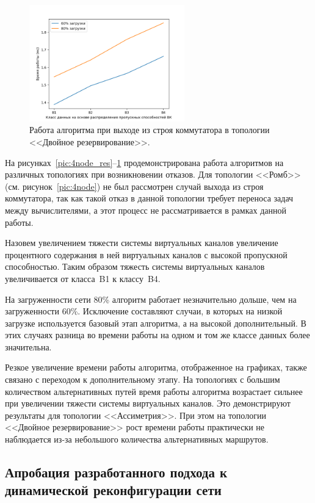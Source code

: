 \documentclass[12pt, a4paper]{article}
\begin{document}
\begin{figure}[h!]
	\centering
	\includegraphics[width=0.60\textwidth]{img/double_res_sw.png}
	\caption{Работа алгоритма при выходе из строя коммутатора в топологии <<Двойное резервирование>>.}
	\label{pic:double_res_sw}
\end{figure}


На рисунках~\ref{pic:4node_res}--\ref{pic:double_res_sw} продемонстрирована работа алгоритмов на различных топологиях при возникновении отказов. Для топологии <<Ромб>> (см. рисунок~\ref{pic:4node}) не был рассмотрен случай выхода из строя коммутатора, так как такой отказ в данной топологии требует переноса задач между вычислителями, а этот процесс не рассматривается в рамках данной работы.

Назовем увеличением тяжести системы виртуальных каналов увеличение процентного содержания в ней виртуальных каналов с высокой пропускной способностью. Таким образом тяжесть системы виртуальных каналов увеличивается от класса~B1 к классу~B4. 

На загруженности сети 80\% алгоритм работает незначительно дольше, чем на загруженности 60\%. Исключение составляют случаи, в которых на низкой загрузке используется базовый этап алгоритма, а на высокой дополнительный. В этих случаях разница во времени работы на одном и том же классе данных более значительна.

Резкое увеличение времени работы алгоритма, отображенное на графиках, также связано с переходом к дополнительному этапу. На топологиях с большим количеством альтернативных путей время работы алгоритма возрастает сильнее при увеличении тяжести системы виртуальных каналов. Это демонстрируют результаты для топологии <<Ассиметрия>>. При этом на топологии <<Двойное резервирование>> рост времени работы практически не наблюдается из-за небольшого количества альтернативных маршрутов.

\FloatBarrier

\subsection{Апробация разработанного подхода к динамической реконфигурации сети} \label{subsec:approbation}
\end{document}
